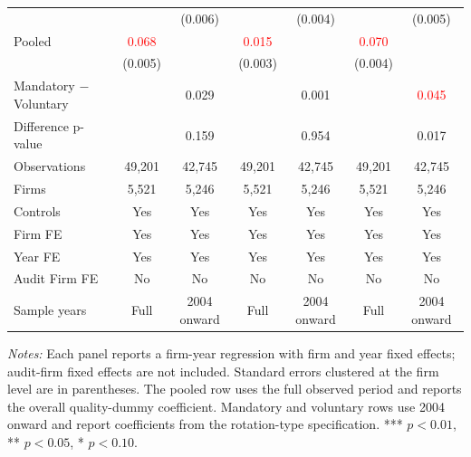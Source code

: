 \begin{table}[htbp]
\begin{threeparttable}
{\begin{tabular}{l cc cc cc}
 &  & (0.006) &  & (0.004) &  & (0.005) \\
Pooled & \textcolor{red}{0.068\sym{***}} &  & \textcolor{red}{0.015\sym{***}} &  & \textcolor{red}{0.070\sym{***}} &  \\
 & (0.005) &  & (0.003) &  & (0.004) &  \\
Mandatory $-$ Voluntary &  & 0.029 &  & 0.001 &  & \textcolor{red}{0.045\sym{**}} \\
Difference p-value &  & 0.159 &  & 0.954 &  & 0.017 \\
Observations & 49,201 & 42,745 & 49,201 & 42,745 & 49,201 & 42,745 \\
Firms & 5,521 & 5,246 & 5,521 & 5,246 & 5,521 & 5,246 \\
\midrule
Controls & Yes & Yes & Yes & Yes & Yes & Yes \\
Firm FE & Yes & Yes & Yes & Yes & Yes & Yes \\
Year FE & Yes & Yes & Yes & Yes & Yes & Yes \\
Audit Firm FE & No & No & No & No & No & No \\
Sample years & Full & 2004 onward & Full & 2004 onward & Full & 2004 onward \\
\bottomrule
\end{tabular}}
\begin{tablenotes}\footnotesize
\item \textit{Notes:} Each panel reports a firm-year regression with firm and year fixed effects; audit-firm fixed effects are not included. Standard errors clustered at the firm level are in parentheses. The pooled row uses the full observed period and reports the overall quality-dummy coefficient. Mandatory and voluntary rows use 2004 onward and report coefficients from the rotation-type specification. *** \(p<0.01\), ** \(p<0.05\), * \(p<0.10\).
\end{tablenotes}
\end{threeparttable}
\end{table}
